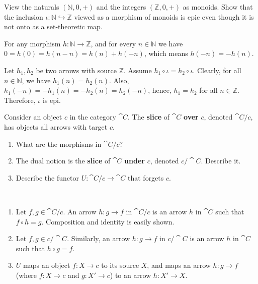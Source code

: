 \documentclass[11pt,a4paper]{article}
\begin{document}
\begin{exercise}
    View the naturals $(\mathbb{N}, 0, +)$ and the integers $(\mathbb{Z}, 0, +)$ as monoids. Show that the inclusion $\iota: \mathbb{N} \hookrightarrow \mathbb{Z}$  viewed as a morphism of monoids is epic even though it is not onto as a set-theoretic map.
\end{exercise}
\begin{solution}
    For any morphism $h: \mathbb{N}\to\mathbb{Z}$, and for every $n\in\mathbb{N}$ we have $0=h(0)=h(n-n)=h(n)+h(-n)$, which means $h(-n)=-h(n)$.\par
    Let $h_1, h_2$ be two arrows with source $\mathbb{Z}$. Assume $h_1\circ\iota = h_2\circ\iota$. Clearly, for all $n\in\mathbb{N}$, we have $h_1(n)=h_2(n)$. Also, $h_1(-n)=-h_1(n)=-h_2(n)=h_2(-n)$, hence, $h_1=h_2$ for all $n\in\mathbb{Z}$. Therefore, $\iota$ is epi.
\end{solution}

\begin{exercise}
    Consider an object $c$ in the category $\cat{C}$. The \textbf{slice} of $\cat{C}$ \textbf{over} $c$, denoted $\cat{C}/c$, has objects all arrows with target $c$.
    \begin{enumerate}[label=(\alph*)]
        \item What are the morphisms in $\cat{C}/c$?
        \item The dual notion is the \textbf{slice} of $\cat{C}$ \textbf{under} $c$, denoted $c/\cat{C}$. Describe it.
        \item Describe the functor $U: \cat{C}/c\to\cat{C}$ that forgets $c$.
    \end{enumerate}
\end{exercise}
\begin{solution}~
    \begin{enumerate}[label=(\alph*)]
        \item Let $f, g\in \cat{C}/c$. An arrow $h: g\to f$ in $\cat{C}/c$ is an arrow $h$ in $\cat{C}$ such that $f\circ h=g$. Composition and identity is easily shown.
        \item Let $f, g\in c/\cat{C}$. Similarly, an arrow $h: g\to f$ in $c/\cat{C}$ is an arrow $h$ in $\cat{C}$ such that $h\circ g=f$.
        \item $U$ maps an object $f:X\to c$ to its source $X$, and maps an arrow $h: g\to f$ (where $f:X\to c$ and $g:X'\to c$) to an arrow $h:X'\to X$.
    \end{enumerate}
\end{solution}
\end{document}
